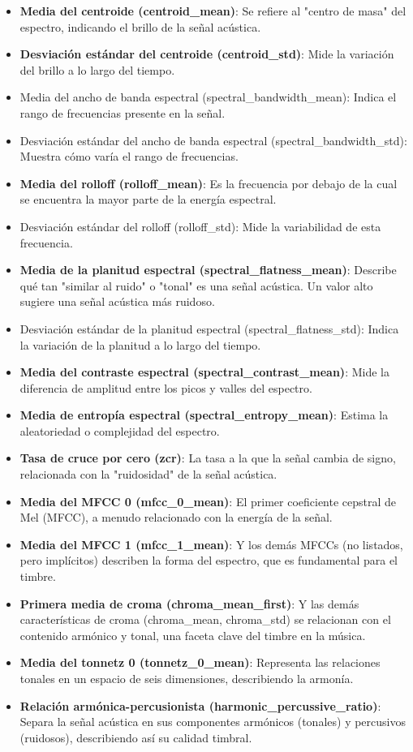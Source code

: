 \documentclass[12pt, letterpaper]{report}
\begin{document}
\begin{itemize}[leftmargin=1.77cm]
\item \textbf{Media del centroide (centroid\_mean)}: Se refiere al "centro de masa" del espectro, indicando el brillo de la señal acústica.
\item \textbf{Desviación estándar del centroide (centroid\_std)}: Mide la variación del brillo a lo largo del tiempo.
\item Media del ancho de banda espectral (spectral\_bandwidth\_mean): Indica el rango de frecuencias presente en la señal.
\item Desviación estándar del ancho de banda espectral (spectral\_bandwidth\_std): Muestra cómo varía el rango de frecuencias.
\item \textbf{Media del rolloff (rolloff\_mean)}: Es la frecuencia por debajo de la cual se encuentra la mayor parte de la energía espectral.
\item Desviación estándar del rolloff (rolloff\_std): Mide la variabilidad de esta frecuencia.
\item \textbf{Media de la planitud espectral (spectral\_flatness\_mean)}: Describe qué tan "similar al ruido" o "tonal" es una señal acústica. Un valor alto sugiere una señal acústica más ruidoso.
\item Desviación estándar de la planitud espectral (spectral\_flatness\_std): Indica la variación de la planitud a lo largo del tiempo.
\item \textbf{Media del contraste espectral (spectral\_contrast\_mean)}: Mide la diferencia de amplitud entre los picos y valles del espectro.
\item \textbf{Media de entropía espectral (spectral\_entropy\_mean)}: Estima la aleatoriedad o complejidad del espectro.
\item \textbf{Tasa de cruce por cero (zcr)}: La tasa a la que la señal cambia de signo, relacionada con la "ruidosidad" de la señal acústica.
\item \textbf{Media del MFCC 0 (mfcc\_0\_mean)}: El primer coeficiente cepstral de Mel (MFCC), a menudo relacionado con la energía de la señal.
\item \textbf{Media del MFCC 1 (mfcc\_1\_mean)}: Y los demás MFCCs (no listados, pero implícitos) describen la forma del espectro, que es fundamental para el timbre.
\item \textbf{Primera media de croma (chroma\_mean\_first)}: Y las demás características de croma (chroma\_mean, chroma\_std) se relacionan con el contenido armónico y tonal, una faceta clave del timbre en la música.
\item \textbf{Media del tonnetz 0 (tonnetz\_0\_mean)}: Representa las relaciones tonales en un espacio de seis dimensiones, describiendo la armonía.
\item \textbf{Relación armónica-percusionista (harmonic\_percussive\_ratio)}: Separa la señal acústica en sus componentes armónicos (tonales) y percusivos (ruidosos), describiendo así su calidad timbral.
\end{itemize}
\end{document}
